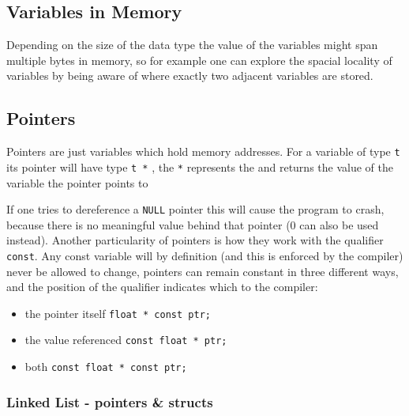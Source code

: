 
\subsection{Variables in Memory}

\par{Depending on the size of the data type the value of the variables might span multiple bytes
in memory, so for example one can explore the spacial locality of variables by being aware of where
exactly two adjacent variables are stored.}


\subsection{Pointers}


\par{Pointers are just variables which hold memory addresses. For a variable of type \texttt{t}
its pointer will have type \texttt{t *} , the \texttt{*} represents the 
and returns the value of the variable the pointer points to}


\par{If one tries to dereference a \texttt{NULL} pointer this will cause the program to crash,
because there is no meaningful value behind that pointer (0 can also be used instead). Another
particularity of pointers is how they work with the qualifier \texttt{const}. Any const variable
will by definition (and this is enforced by the compiler) never be allowed to change, pointers can
remain constant in three different ways, and the position of the qualifier indicates which to the
compiler:}

\begin{itemize}
    \item the pointer itself \texttt{float * const ptr;}
    \item the value referenced \texttt{const float * ptr;}
    \item both \texttt{const float * const ptr;}
\end{itemize}

\subsubsection{Linked List - pointers \& structs}

